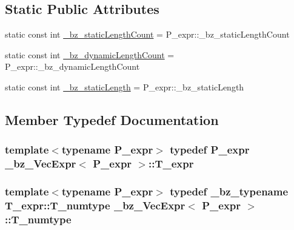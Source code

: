 \subsection*{Static Public Attributes}
\begin{DoxyCompactItemize}
\item 
static const int \hyperlink{class__bz__VecExpr_a278f996149c247948a82d685a5b51b8b}{\+\_\+bz\+\_\+static\+Length\+Count} = P\+\_\+expr\+::\+\_\+bz\+\_\+static\+Length\+Count
\item 
static const int \hyperlink{class__bz__VecExpr_a9d1a2ebe206d0ee075b2fd40f5a21e56}{\+\_\+bz\+\_\+dynamic\+Length\+Count} = P\+\_\+expr\+::\+\_\+bz\+\_\+dynamic\+Length\+Count
\item 
static const int \hyperlink{class__bz__VecExpr_a5817f87504be43c4618189f3b31e6ec7}{\+\_\+bz\+\_\+static\+Length} = P\+\_\+expr\+::\+\_\+bz\+\_\+static\+Length
\end{DoxyCompactItemize}


\subsection{Member Typedef Documentation}
\hypertarget{class__bz__VecExpr_a90eb5d7b7a7d258c358c08a4a784d699}{}
\subsubsection[{T\+\_\+expr}]{\setlength{\rightskip}{0pt plus 5cm}template$<$typename P\+\_\+expr$>$ typedef P\+\_\+expr {\bf \+\_\+bz\+\_\+\+Vec\+Expr}$<$ P\+\_\+expr $>$\+::{\bf T\+\_\+expr}}\label{class__bz__VecExpr_a90eb5d7b7a7d258c358c08a4a784d699}
\hypertarget{class__bz__VecExpr_ab7447aabb0c245aab4cb0285d05b590e}{}
\subsubsection[{T\+\_\+numtype}]{\setlength{\rightskip}{0pt plus 5cm}template$<$typename P\+\_\+expr$>$ typedef {\bf \+\_\+bz\+\_\+typename} T\+\_\+expr\+::\+T\+\_\+numtype {\bf \+\_\+bz\+\_\+\+Vec\+Expr}$<$ P\+\_\+expr $>$\+::{\bf T\+\_\+numtype}}\label{class__bz__VecExpr_ab7447aabb0c245aab4cb0285d05b590e}


